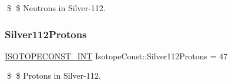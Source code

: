 \$ \$ Neutrons in Silver-\/112. \mbox{\label{group___isotope_const-_silver-_ag112_ga0dce6e806a3b0682fa5895f05644b3be}} 
\subsubsection{\texorpdfstring{Silver112\+Protons}{Silver112Protons}}
{\footnotesize\ttfamily \mbox{\hyperlink{group___isotope_const-_macros_ga5f18360b3e99483a35c32d789e62621c}{I\+S\+O\+T\+O\+P\+E\+C\+O\+N\+S\+T\+\_\+\+I\+NT}} Isotope\+Const\+::\+Silver112\+Protons = 47}

\$ \$ Protons in Silver-\/112. 